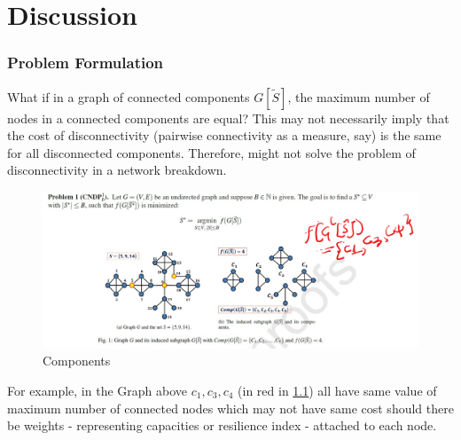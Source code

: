 \chapter{Discussion}
\label{cap:discussion}
\subsection{Problem Formulation}
What if in a graph of connected components $G[\tilde{S}]$, the maximum number of nodes in a connected components are equal? This may not necessarily imply that the cost of disconnectivity (pairwise connectivity as a measure, say) is the same for all disconnected components. Therefore, might not solve the problem of disconnectivity in a network breakdown.
\begin{figure}[htb!]
    \centering \includegraphics[width=\textwidth]{graphics/conn_comp.png}
    \caption{Components}
    \label{fig:conn_comp}
\end{figure}
For example, in the Graph above ${c_1, c_3, c_4}$ (in red in \ref{fig:conn_comp}) all have same value of maximum number of connected nodes which may not have same cost should there be weights - representing capacities or resilience index - attached to each node.
